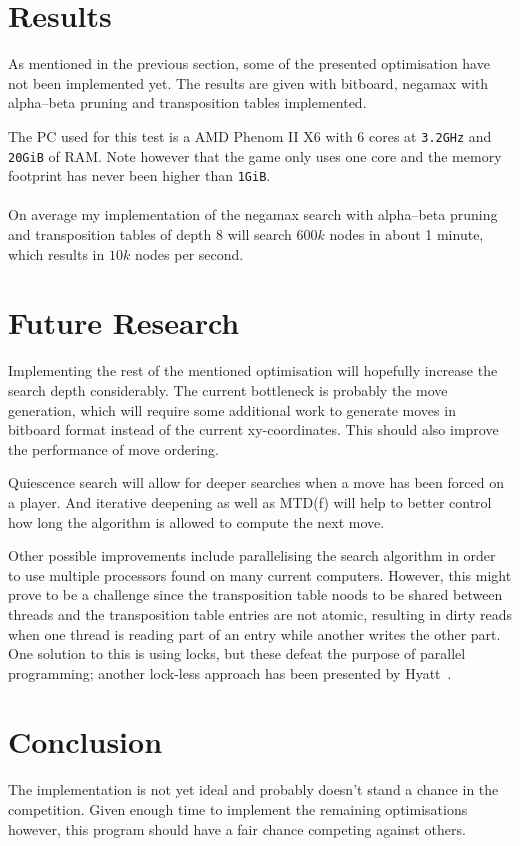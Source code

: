 \documentclass[a4paper,10pt]{article}
\begin{document}
\section{Results}
As mentioned in the previous section, some of the presented optimisation have not been implemented yet. The results are given with bitboard, negamax with alpha--beta pruning and transposition tables implemented.

The PC used for this test is a AMD Phenom II X6 with 6 cores at \texttt{3.2GHz} and \texttt{20GiB} of RAM. Note however that the game only uses one core and the memory footprint has never been higher than \texttt{1GiB}.
\\
\\
On average my implementation of the negamax search with alpha--beta pruning and transposition tables of depth 8 will search $600k$ nodes in about 1 minute, which results in $10k$ nodes per second.

\section{Future Research}
Implementing the rest of the mentioned optimisation will hopefully increase the search depth considerably. The current bottleneck is probably the move generation, which will require some additional work to generate moves in bitboard format instead of the current xy-coordinates. This should also improve the performance of move ordering.

Quiescence search will allow for deeper searches when a move has been forced on a player. And iterative deepening as well as MTD(f) will help to better control how long the algorithm is allowed to compute the next move.

Other possible improvements include parallelising the search algorithm in order to use multiple processors found on many current computers. However, this might prove to be a challenge since the transposition table noods to be shared between threads and the transposition table entries are not atomic, resulting in dirty reads when one thread is reading part of an entry while another writes the other part. One solution to this is using locks, but these defeat the purpose of parallel programming; another lock-less approach has been presented by Hyatt~\cite{Hyatt2002}.

\section{Conclusion}
The implementation is not yet ideal and probably doesn't stand a chance in the competition. Given enough time to implement the remaining optimisations however, this program should have a fair chance competing against others.


\end{document}
